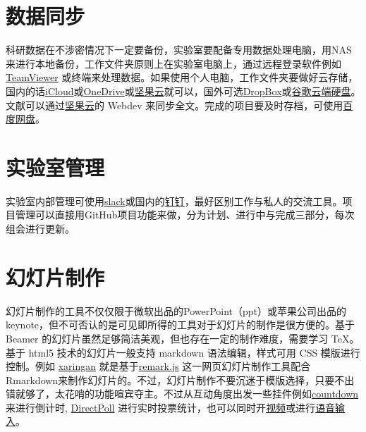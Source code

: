 \documentclass[]{tufte-book}
\begin{document}
\hypertarget{ux6570ux636eux540cux6b65}{%
\section*{数据同步}\label{ux6570ux636eux540cux6b65}}

科研数据在不涉密情况下一定要备份，实验室要配备专用数据处理电脑，用NAS来进行本地备份，工作文件夹原则上在实验室电脑上，通过远程登录软件例如 \href{https://www.teamviewer.com/en-us/}{TeamViewer} 或终端来处理数据。如果使用个人电脑，工作文件夹要做好云存储，国内的话\href{https://www.icloud.com/}{iCloud}或\href{https://onedrive.live.com/about/en-us/}{OneDrive}或\href{https://www.jianguoyun.com/\#/}{坚果云}就可以，国外可选\href{https://www.dropbox.com/}{DropBox}或\href{https://drive.google.com/drive/my-drive}{谷歌云端硬盘}。文献可以通过\href{https://www.jianguoyun.com/\#/}{坚果云}的 Webdev 来同步全文。完成的项目要及时存档，可使用\href{https://pan.baidu.com/}{百度网盘}。

\hypertarget{ux5b9eux9a8cux5ba4ux7ba1ux7406}{%
\section{实验室管理}\label{ux5b9eux9a8cux5ba4ux7ba1ux7406}}

实验室内部管理可使用\href{https://slack.com/}{slack}或国内的\href{https://www.dingtalk.com/}{钉钉}，最好区别工作与私人的交流工具。项目管理可以直接用GitHub项目功能来做，分为计划、进行中与完成三部分，每次组会进行更新。

\hypertarget{ux5e7bux706fux7247ux5236ux4f5c}{%
\section*{幻灯片制作}\label{ux5e7bux706fux7247ux5236ux4f5c}}

幻灯片制作的工具不仅仅限于微软出品的PowerPoint（ppt）或苹果公司出品的 keynote，但不可否认的是可见即所得的工具对于幻灯片的制作是很方便的。基于 Beamer 的幻灯片虽然足够简洁美观，但也存在一定的制作难度，需要学习 TeX。基于 html5 技术的幻灯片一般支持 markdown 语法编辑，样式可用 CSS 模版进行控制。例如 \href{https://github.com/yihui/xaringan}{xaringan} 就是基于\href{https://remarkjs.com}{remark.js} 这一网页幻灯片制作工具配合Rmarkdown来制作幻灯片的。不过，幻灯片制作不要沉迷于模版选择，只要不出错就够了，太花哨的功能喧宾夺主。不过从互动角度出发一些挂件例如\href{https://pkg.garrickadenbuie.com/countdown}{countdown} 来进行倒计时, \href{https://directpoll.com}{DirectPoll} 进行实时投票统计，也可以同时开\href{https://yihui.name/en/2017/12/html5-camera/}{视频}或进行\href{https://yihui.shinyapps.io/voice/}{语音输入}。
\end{document}

